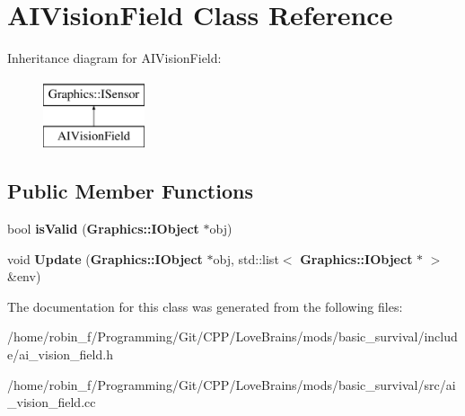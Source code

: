 \section{A\+I\+Vision\+Field Class Reference}
\label{class_a_i_vision_field}
Inheritance diagram for A\+I\+Vision\+Field\+:\begin{figure}[H]
\begin{center}
\leavevmode
\includegraphics[height=2.000000cm]{class_a_i_vision_field}
\end{center}
\end{figure}
\subsection*{Public Member Functions}
\begin{DoxyCompactItemize}
\item 
bool {\bfseries is\+Valid} ({\bf Graphics\+::\+I\+Object} $\ast$obj)\label{class_a_i_vision_field_a800c0a1bc9a631c08935c6d7a7478208}

\item 
void {\bfseries Update} ({\bf Graphics\+::\+I\+Object} $\ast$obj, std\+::list$<$ {\bf Graphics\+::\+I\+Object} $\ast$ $>$ \&env)\label{class_a_i_vision_field_a97609f88baacf59e0cc9fae6245ba7b9}

\end{DoxyCompactItemize}


The documentation for this class was generated from the following files\+:\begin{DoxyCompactItemize}
\item 
/home/robin\+\_\+f/\+Programming/\+Git/\+C\+P\+P/\+Love\+Brains/mods/basic\+\_\+survival/include/ai\+\_\+vision\+\_\+field.\+h\item 
/home/robin\+\_\+f/\+Programming/\+Git/\+C\+P\+P/\+Love\+Brains/mods/basic\+\_\+survival/src/ai\+\_\+vision\+\_\+field.\+cc\end{DoxyCompactItemize}
